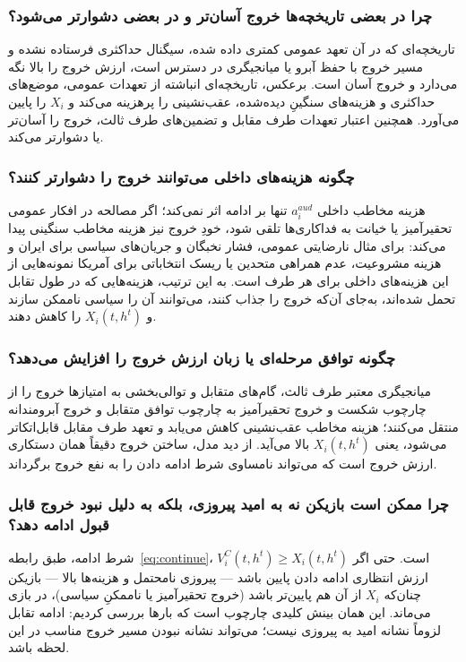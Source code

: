 \documentclass[12pt]{article}
\begin{document}
\subsubsection*{چرا در بعضی تاریخچه‌ها خروج آسان‌تر و در بعضی دشوارتر می‌شود؟}

تاریخچه‌ای که در آن تعهد عمومی کمتری داده شده، سیگنال حداکثری فرستاده نشده
و مسیر خروج با حفظ آبرو یا میانجیگری در دسترس است، ارزش خروج را بالا نگه می‌دارد
و خروج آسان است. برعکس، تاریخچه‌ای انباشته از تعهدات عمومی،
موضع‌های حداکثری و هزینه‌های سنگینِ دیده‌شده، عقب‌نشینی را پرهزینه می‌کند
و $X_i$ را پایین می‌آورد. همچنین اعتبار تعهدات طرف مقابل
و تضمین‌های طرف ثالث، خروج را آسان‌تر یا دشوارتر می‌کند.

\subsubsection*{چگونه هزینه‌های داخلی می‌توانند خروج را دشوارتر کنند؟}

هزینه مخاطب داخلی $a_i^{aud}$
 تنها بر ادامه اثر نمی‌کند؛
اگر مصالحه در افکار عمومی تحقیرآمیز یا خیانت به فداکاری‌ها تلقی شود،
خودِ خروج نیز هزینه مخاطب سنگینی پیدا می‌کند:
برای مثال نارضایتی عمومی، فشار نخبگان و جریان‌های سیاسی برای ایران
و
هزینه مشروعیت، عدم همراهی متحدین یا ریسک انتخاباتی برای آمریکا
نمونه‌هایی از این هزینه‌های داخلی برای هر طرف است.
به این ترتیب، هزینه‌هایی که در طول تقابل تحمل شده‌اند،
به‌جای آن‌که خروج را جذاب کنند، می‌توانند آن را سیاسی ناممکن سازند
و $X_i(t,h^t)$ را کاهش دهند.

\subsubsection*{چگونه توافق مرحله‌ای یا زبان  ارزش خروج را افزایش می‌دهد؟}

میانجیگری معتبر طرف ثالث، گام‌های متقابل و توالی‌بخشی به امتیازها
 خروج را از چارچوب شکست و خروج تحقیرآمیز به چارچوب توافق متقابل و خروج آبرومندانه منتقل می‌کنند؛
هزینه مخاطب عقب‌نشینی کاهش می‌یابد و تعهد طرف مقابل قابل‌اتکاتر می‌شود،
یعنی $X_i(t,h^t)$ بالا می‌آید. از دید مدل، ساختن خروج دقیقاً همان
دستکاری ارزش خروج است که می‌تواند نامساوی شرط ادامه دادن را به نفع خروج برگرداند.

\subsubsection*{چرا ممکن است بازیکن نه به امید پیروزی، بلکه به دلیل نبود خروج قابل قبول ادامه دهد؟}

شرط ادامه، طبق رابطه~\eqref{eq:continue}، $V_i^C(t,h^t) \ge X_i(t,h^t)$ است.
حتی اگر ارزش انتظاری ادامه دادن پایین باشد — پیروزی نامحتمل و هزینه‌ها بالا —
بازیکن چنان‌که $X_i$
 از آن هم پایین‌تر باشد 
(خروج تحقیرآمیز یا ناممکنِ سیاسی)،
در بازی می‌ماند. این همان بینش کلیدی چارچوب است که بارها بررسی کردیم:
ادامه تقابل لزوماً نشانه امید به پیروزی نیست؛
می‌تواند نشانه نبودن مسیر خروج مناسب در این لحظه باشد.
\end{document}
